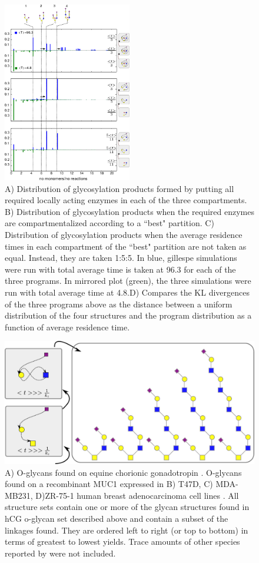 \documentclass{article}
\begin{document}
\begin{figure}[h]
    \includegraphics[width=0.5\textwidth]{Figure_4.pdf}
	\caption{A) Distribution of glycosylation products formed by putting all required locally acting enzymes in each of the three compartments. B) Distribution of glycosylation products when the required enzymes are compartmentalized according to a ``best" partition. C) Distribution of glycosylation products when the average residence times in each compartment of the ``best" partition are not taken as equal. Instead, they are taken 1:5:5. In blue, gillespe simulations were run with total average time is taken at 96.3 for each of the three programs. In mirrored plot (green), the three simulations were run with total average time at 4.8.D) Compares the KL divergences of the three programs above as the distance between a uniform distribution of the four structures and the program distribution as a function of average residence time.}
\end{figure}


\begin{figure}[t]
    \includegraphics[width=\textwidth]{Figure_6.pdf}
	\caption{A) O-glycans found on equine chorionic gonadotropin \cite{Hokke1994}. O-glycans found on a recombinant MUC1 expressed in B) T47D, C) MDA-MB231, D)ZR-75-1 human breast adenocarcinoma cell lines \cite{Muller2002}. All structure sets contain one or more of the glycan structures found in hCG o-glycan set described above and contain a subset of the linkages found. They are ordered left to right (or top to bottom) in terms of greatest to lowest yields. Trace amounts of other species reported by \cite{Muller2002} were not included.}
\end{figure}
\end{document}
